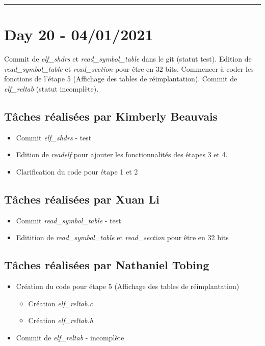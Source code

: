 \documentclass[11pt,letterpaper]{article}
\begin{document}
\noindent\rule{13cm}{0.4pt}

\section*{Day 20 - 04/01/2021}
Commit de \textit{elf\_shdrs} et \textit{read\_symbol\_table} dans le git (statut
test). Edition de \textit{read\_symbol\_table} et \textit{read\_section} pour 
être en 32 bits. Commencer à coder les fonctions de l'étape 5 (Affichage des tables 
de réimplantation). Commit de \textit{elf\_reltab} (statut incomplète).


\subsection*{Tâches réalisées par Kimberly Beauvais}
\begin{itemize}
    \item Commit \textit{elf\_shdrs} - test
    \item Edition de \textit{readelf} pour ajouter les fonctionnalités des étapes
    3 et 4. 
    \item Clarification du code pour étape 1 et 2
\end{itemize}

\subsection*{Tâches réalisées par Xuan Li}
\begin{itemize}
    \item Commit \textit{read\_symbol\_table} - test
    \item Editition de \textit{read\_symbol\_table} et \textit{read\_section} 
    pour être en 32 bits
\end{itemize}

\subsection*{Tâches réalisées par Nathaniel Tobing}
\begin{itemize}
    \item Création du code pour étape 5 (Affichage des tables de réimplantation)
    \begin{itemize}
        \item Création \textit{elf\_reltab.c} 
        \item Création \textit{elf\_reltab.h}
    \end{itemize}
    \item Commit de \textit{elf\_reltab} - incomplète
\end{itemize}
\end{document}
